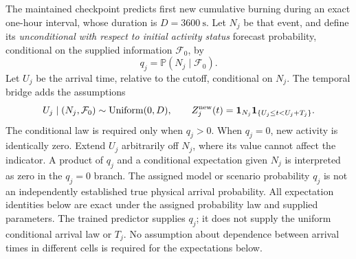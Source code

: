 \documentclass[11pt,a4paper]{article}
\newcommand{\Ind}{\mathbf{1}}
\begin{document}
The maintained checkpoint predicts first new cumulative burning during an
exact one-hour interval, whose duration is
$D=3600\ \mathrm{s}$. Let $N_j$ be that event, and define its
\emph{unconditional with respect to initial activity status} forecast
probability, conditional on the supplied information $\mathcal F_0$, by
\begin{equation}
 q_j=\mathbb P(N_j\mid\mathcal F_0).
\end{equation}
Let $U_j$ be the arrival time, relative to the cutoff, conditional on $N_j$.
The temporal bridge adds the assumptions
\begin{equation}
 U_j\mid(N_j,\mathcal F_0)\sim\operatorname{Uniform}(0,D),
 \qquad
 Z_j^{\rm new}(t)=\Ind_{N_j}\Ind_{\{U_j\le t<U_j+T_j\}}.
 \label{eq:heat-uniform-arrival}
\end{equation}
The conditional law is required only when $q_j>0$. When $q_j=0$,
new activity is identically zero. Extend $U_j$ arbitrarily off $N_j$, where
its value cannot affect the indicator. A product of $q_j$ and a conditional
expectation given $N_j$ is interpreted as zero in the $q_j=0$ branch.
The assigned model or scenario probability $q_j$ is not an independently
established true physical arrival probability. All expectation identities
below are exact under the assigned probability law and supplied parameters.
The trained predictor supplies $q_j$; it does not supply the uniform
conditional arrival law or $T_j$. No assumption about dependence between
arrival times in different cells is required for the expectations below.
\end{document}

